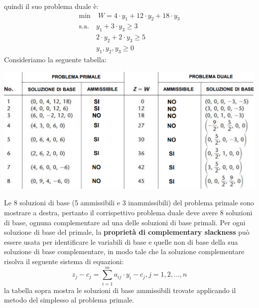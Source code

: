 \documentclass[12pt]{article}
\begin{document}
quindi il suo problema duale è:
\begin{equation*}
    \begin{array}{ll}
        \displaystyle \textrm{min} & \; W = 4 \cdot y_1 + 12 \cdot y_2 + 18 \cdot y_3\\
        \textrm{s.a.} & y_1 + 3 \cdot y_3 \geq 3\\
        \phantom{} & 2 \cdot y_2 + 2 \cdot y_3 \geq 5\\
        \phantom{} & y_1,y_2, y_3 \geq 0
    \end{array}
\end{equation*}
Consideriamo la seguente tabella:
\begin{center}
    \includegraphics[width = 1\linewidth]{Images/53.png}
\end{center}
Le 8 soluzioni di base (5 ammissibili e 3 inammissibili) del problema primale sono mostrare a destra,
pertanto il corrispettivo problema duale deve avere 8 soluzioni di base, ognuna complementare ad una delle soluzioni di base primali.
Per ogni soluzione di base del primale, la \textbf{proprietà di complementary slackness} può essere usata per identificare le variabili di base
e quelle non di base della sua soluzione di base complementare, in modo tale che la soluzione complementare risolva il seguente sistema di equazioni:
$$z_j - c_j = \sum_{i=1}^{m} a_{ij} \cdot y_i - c_j, j = 1, 2, ..., n$$
\noindent 
la tabella sopra mostra le soluzioni di base ammissibili trovate applicando il metodo del simplesso al problema primale.
\end{document}
